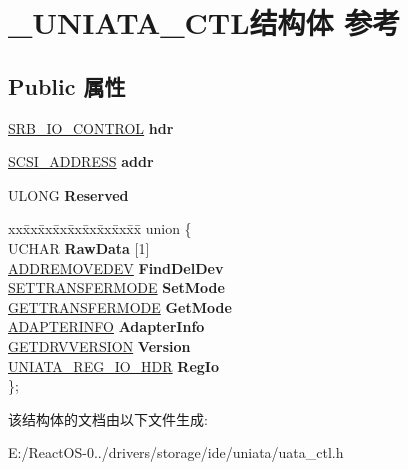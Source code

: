 \hypertarget{struct___u_n_i_a_t_a___c_t_l}{}\section{\+\_\+\+U\+N\+I\+A\+T\+A\+\_\+\+C\+T\+L结构体 参考}
\label{struct___u_n_i_a_t_a___c_t_l}
\subsection*{Public 属性}
\begin{DoxyCompactItemize}
\item 
\mbox{\label{struct___u_n_i_a_t_a___c_t_l_a77ed38a4de81d60539ed0fdbc94f1361}} 
\hyperlink{struct___s_r_b___i_o___c_o_n_t_r_o_l}{S\+R\+B\+\_\+\+I\+O\+\_\+\+C\+O\+N\+T\+R\+OL} {\bfseries hdr}
\item 
\mbox{\label{struct___u_n_i_a_t_a___c_t_l_a453754b7a1602f39d09fdc60ea3b46e8}} 
\hyperlink{struct___s_c_s_i___a_d_d_r_e_s_s}{S\+C\+S\+I\+\_\+\+A\+D\+D\+R\+E\+SS} {\bfseries addr}
\item 
\mbox{\label{struct___u_n_i_a_t_a___c_t_l_a82a7c6e558b6015897058a1405ff78c0}} 
U\+L\+O\+NG {\bfseries Reserved}
\item 
\mbox{\label{struct___u_n_i_a_t_a___c_t_l_a0a82c02a460ff7a11bf1312454d013bb}} 
\begin{tabbing}
xx\=xx\=xx\=xx\=xx\=xx\=xx\=xx\=xx\=\kill
union \{\\
\>UCHAR {\bfseries RawData} \mbox{[}1\mbox{]}\\
\>\hyperlink{struct___a_d_d_r_e_m_o_v_e_d_e_v}{ADDREMOVEDEV} {\bfseries FindDelDev}\\
\>\hyperlink{struct___s_e_t_t_r_a_n_s_f_e_r_m_o_d_e}{SETTRANSFERMODE} {\bfseries SetMode}\\
\>\hyperlink{struct___g_e_t_t_r_a_n_s_f_e_r_m_o_d_e}{GETTRANSFERMODE} {\bfseries GetMode}\\
\>\hyperlink{struct___a_d_a_p_t_e_r_i_n_f_o}{ADAPTERINFO} {\bfseries AdapterInfo}\\
\>\hyperlink{struct___g_e_t_d_r_v_v_e_r_s_i_o_n}{GETDRVVERSION} {\bfseries Version}\\
\>\hyperlink{struct___u_n_i_a_t_a___r_e_g___i_o___h_d_r}{UNIATA\_REG\_IO\_HDR} {\bfseries RegIo}\\
\}; \\

\end{tabbing}\end{DoxyCompactItemize}


该结构体的文档由以下文件生成\+:\begin{DoxyCompactItemize}
\item 
E\+:/\+React\+O\+S-\/0../drivers/storage/ide/uniata/uata\+\_\+ctl.\+h\end{DoxyCompactItemize}
